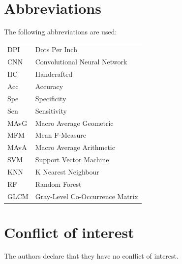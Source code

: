 \documentclass[twocolumn]{svjour3}           %
\begin{document}

\newpage
\newpage
\section*{Abbreviations}
The following abbreviations are used: 

	\begin{tabular}{l | l}
        DPI     &   Dots Per Inch                       \\
    	CNN     &   Convolutional Neural Network        \\
    	HC      &   Handcrafted                         \\
    	Acc     &   Accuracy                            \\
    	Spe     &   Specificity                         \\
    	Sen     &   Sensitivity                         \\
    	MAvG    &   Macro Average Geometric             \\
    	MFM     &   Mean F-Measure                      \\
    	MAvA    &   Macro Average Arithmetic            \\
    	SVM     &   Support Vector Machine              \\  
    	KNN     &   K Nearest Neighbour                 \\
    	RF      &   Random Forest                       \\
    	GLCM    &   Gray-Level Co-Occurrence Matrix     \\    
    \end{tabular}

\section*{Conflict of interest}
The authors declare that they have no conflict of interest.


      

\end{document}
